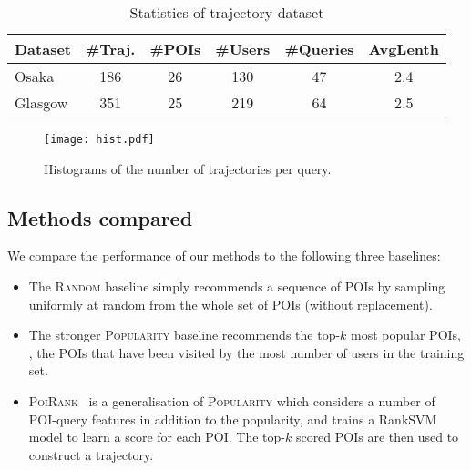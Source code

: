 
\begin{table}[t]
\caption{Statistics of trajectory dataset}
\label{tab:data}
\centering
\setlength{\tabcolsep}{4pt} %
\small
\begin{tabular}{l*{5}{c}} \hline
\textbf{Dataset} & \textbf{\#Traj.} & \textbf{\#POIs} & \textbf{\#Users} & \textbf{\#Queries} & \textbf{AvgLenth} \\ \hline
Osaka            & 186              & 26              & 130              & 47                 & 2.4 \\
Glasgow          & 351              & 25              & 219              & 64                 & 2.5 \\
\hline
\end{tabular}
\end{table}


\begin{figure}[t]
	\centering
	\texttt{[image: hist.pdf]}
	\caption{Histograms of the number of trajectories per query.}
	\label{fig:hist}
\end{figure}


\secmoveup
\subsection{Methods compared}
\textmoveup

We compare the performance of our methods to the following three baselines:
\begin{itemize}[leftmargin=0.125in]\itemmoveup
\parskip -.05em
\item The \textsc{Random} baseline simply recommends a sequence of POIs by sampling uniformly at random from the whole set of POIs (without replacement).

\item The stronger \textsc{Popularity} baseline recommends the top-$k$ most popular POIs, 
      \ie, the POIs that have been visited by the most number of users in the training set.

\item \textsc{PoiRank}~\cite{cikm16paper} is a generalisation of \textsc{Popularity} 
      which considers a number of POI-query features in addition to the popularity,
      and trains a RankSVM model to learn a score for each POI. The top-$k$ scored POIs are then used to construct a trajectory.
\end{itemize}\itemmoveup

